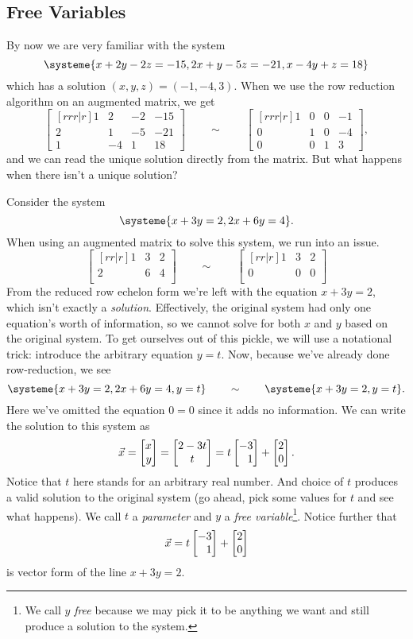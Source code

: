\subsection{Free Variables}
By now we are very familiar with the system
\begin{equation}
		\systeme{
			x+2y-2z=-15,
			2x+y-5z=-21,
			x-4y+z=18
		}
\end{equation}
which has a solution $(x,y,z)=(-1,-4,3)$. When we use the row reduction algorithm
on an augmented matrix, we get
\[
		\begin{bmatrix}[rrr|r]
			1&2&-2 & -15\\
			2&1&-5&-21\\
			1&-4&1&18
		\end{bmatrix}
		\qquad\sim\qquad
		\begin{bmatrix}[rrr|r]
			1&0&0 & -1\\
			0&1&0&-4\\
			0&0&1&3
		\end{bmatrix},
\]
and we can read the unique solution directly from the matrix. But what happens when there isn't a 
unique solution?

Consider the system
\begin{equation}
	\label{EQFREEVAR}
	\systeme{x+3y=2,2x+6y=4}.
\end{equation}
When using an augmented matrix to solve this system, we run into an issue.
\[
		\begin{bmatrix}[rr|r]
			1&3 & 2\\
			2&6&4\\
		\end{bmatrix}
		\qquad\sim\qquad
		\begin{bmatrix}[rr|r]
			1&3&2\\
			0&0&0\\
		\end{bmatrix}
\]
From the reduced row echelon form we're left with the equation $x+3y=2$, which isn't exactly
a \emph{solution}. Effectively, the original system had only one equation's worth of information,
so we cannot solve for both $x$ and $y$ based on the original system. To get ourselves out of
this pickle, we will use a notational trick: introduce the arbitrary equation $y=t$.
Now, because we've already done row-reduction, we see
\[
	\systeme{x+3y=2,2x+6y=4,y=t}\qquad\sim\qquad
	\systeme{x+3y=2,y=t}.
\]
Here we've omitted the equation $0=0$ since it adds no information.
We can write the solution to this system as
\[
	\vec x=\mat{x\\y} = \matc{2-3t\\t}=t\mat{-3\\1}+\mat{2\\0}.
\]
Notice that $t$ here stands for an arbitrary real number. And choice of $t$
produces a valid solution to the original system (go ahead, pick some values
for $t$ and see what happens).  We call $t$ a \emph{parameter} and $y$ a
\emph{free variable}\footnote{ We call $y$ \emph{free} because we may pick
it to be anything we want and still produce a solution to the system.}.
Notice further that 
\[
	\vec x=t\mat{-3\\1}+\mat{2\\0}
\]
is vector form of the line $x+3y=2$.

